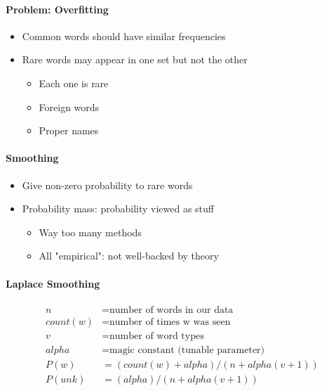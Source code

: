       \paragraph{Problem: Overfitting}
      \begin{itemize}
        \item Common words should have similar frequencies
        \item Rare words may appear in one set but not the other
        \begin{itemize}
          \item Each one is rare
          \item Foreign words
          \item Proper names
        \end{itemize}
      \end{itemize}

      \paragraph{Smoothing}
      \begin{itemize}
        \item Give non-zero probability to rare words
        \item Probability mass: probability viewed as stuff
        \begin{itemize}
          \item Way too many methods
          \item All "empirical": not well-backed by theory
        \end{itemize}
      \end{itemize}

      \paragraph{Laplace Smoothing}
      \begin{align*}
        n &= \text{number of words in our data} \\
        count(w) &= \text{number of times w was seen} \\
        v &= \text{number of word types} \\
        alpha &= \text{magic constant (tunable parameter)} \\
        P(w) &= (count(w) + alpha) / (n + alpha (v + 1)) \\
        P(unk) &= (alpha) / (n + alpha (v + 1))
      \end{align*}

